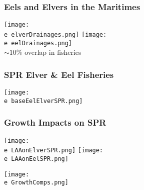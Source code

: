 \documentclass{beamer}
\newcommand{\e}{/SpinDr/backup/bio_data/bio.eels/figures/}
\begin{document}
\begin{frame}
	\frametitle{Eels and Elvers in the Maritimes}
	\centering
	  \texttt{[image: \\e elverDrainages.png]}
	  \texttt{[image: \\e eelDrainages.png]}\\
	  {\tiny{$\sim 10\%$ overlap in fisheries}}



\end{frame}

\begin{frame}
	\frametitle{SPR Elver \& Eel Fisheries}
	\centering
	  \texttt{[image: \\e baseEelElverSPR.png]}

\end{frame}



\begin{frame}
	\frametitle{Growth Impacts on SPR}
	\centering
	  \texttt{[image: \\e LAAonElverSPR.png]}
		  \texttt{[image: \\e LAAonEelSPR.png]}
	
	  \texttt{[image: \\e GrowthComps.png]}
	
\end{frame}


	
\end{document}
